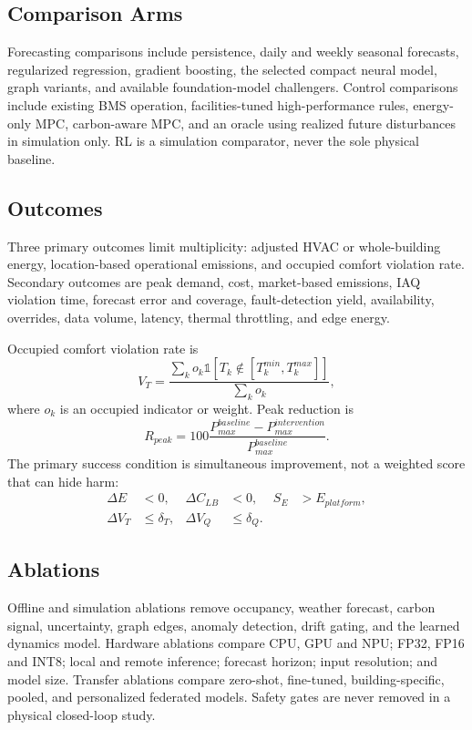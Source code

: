\subsection{Comparison Arms}

Forecasting comparisons include persistence, daily and weekly seasonal forecasts, regularized regression, gradient boosting, the selected compact neural model, graph variants, and available foundation-model challengers. Control comparisons include existing BMS operation, facilities-tuned high-performance rules, energy-only MPC, carbon-aware MPC, and an oracle using realized future disturbances in simulation only. RL is a simulation comparator, never the sole physical baseline.

\subsection{Outcomes}

Three primary outcomes limit multiplicity: adjusted HVAC or whole-building energy, location-based operational emissions, and occupied comfort violation rate. Secondary outcomes are peak demand, cost, market-based emissions, IAQ violation time, forecast error and coverage, fault-detection yield, availability, overrides, data volume, latency, thermal throttling, and edge energy.

Occupied comfort violation rate is
\begin{equation}
	V_T=\frac{\sum_ko_k\mathbb{1}[T_k\notin[T_k^{min},T_k^{max}]]}{\sum_ko_k},
\end{equation}
where $o_k$ is an occupied indicator or weight. Peak reduction is
\begin{equation}
	R_{peak}=100\frac{P_{max}^{baseline}-P_{max}^{intervention}}{P_{max}^{baseline}}.
\end{equation}
The primary success condition is simultaneous improvement, not a weighted score that can hide harm:
\begin{align}
	\Delta E   & <0,          & \Delta C_{LB} & <0,          & S_E & >E_{platform},\nonumber \\
	\Delta V_T & \le\delta_T, & \Delta V_Q    & \le\delta_Q. &     &
\end{align}

\subsection{Ablations}

Offline and simulation ablations remove occupancy, weather forecast, carbon signal, uncertainty, graph edges, anomaly detection, drift gating, and the learned dynamics model. Hardware ablations compare CPU, GPU and NPU; FP32, FP16 and INT8; local and remote inference; forecast horizon; input resolution; and model size. Transfer ablations compare zero-shot, fine-tuned, building-specific, pooled, and personalized federated models. Safety gates are never removed in a physical closed-loop study.

